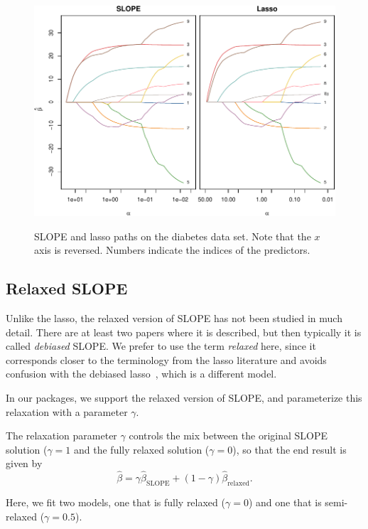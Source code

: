 \documentclass[article]{jss}
\makeatletter
\let\natwidth\Gin@nat@width
\makeatother
\begin{document}
\begin{figure}[tp]
  \centering
  {\includegraphics[width=\natwidth]{images/diabetes-slope-lasso.pdf}}
  \caption{%
    SLOPE and lasso paths on the diabetes
    data set. Note that the \(x\) axis is reversed. Numbers indicate
    the indices of the predictors.
  }
  \label{fig:diabetes}
\end{figure}


\subsection{Relaxed SLOPE}

Unlike the lasso, the relaxed version of SLOPE has not been studied in much detail.
There are at least two papers where it is described, but then typically it is
called \emph{debiased} SLOPE. We prefer to use the term \emph{relaxed} here,
since it corresponds closer to the terminology from the lasso literature and
avoids confusion with the debiased lasso~\citep{geer2014}, which is a different
model.

In our packages, we support the relaxed version of SLOPE, and parameterize
this relaxation with a parameter \(\gamma\).

The relaxation parameter \(\gamma\) controls the mix between the
original SLOPE solution (\(\gamma = 1\) and the fully relaxed
solution (\(\gamma = 0\)), so that
the end result is given by
\[
  \hat{\beta} = \gamma \hat{\beta}_\text{SLOPE} + (1 - \gamma) \hat{\beta}_\text{relaxed}.
\]

Here, we fit two models, one that is fully relaxed
(\(\gamma = 0\)) and one that is semi-relaxed (\(\gamma = 0.5\)).
\end{document}
